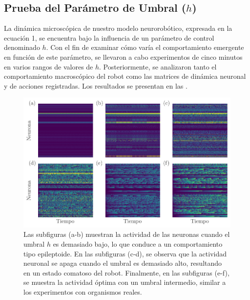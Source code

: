 \subsection{Prueba del Parámetro de Umbral ($h$)}	

La dinámica microscópica de nuestro modelo neurorobótico, expresada en la ecuación 1, se encuentra bajo la influencia de un parámetro de control denominado $h$. Con el fin de examinar cómo varía el comportamiento emergente en función de este parámetro, se llevaron a cabo experimentos de cinco minutos en varios rangos de valores de $h$. Posteriormente, se analizaron tanto el comportamiento macroscópico del robot como las matrices de dinámica neuronal y de acciones registradas. Los resultados se presentan en las  .


\begin{figure}[h!]
	\centering\includegraphics[width=\imsize]{valores-neuronas_umbrales.pdf}
	\caption[ Resultados de la Prueba del Parámetro de Umbral ($h$).]{ Las subfiguras (a-b) muestran la actividad de las neuronas cuando el umbral $h$ es demasiado bajo, lo que conduce a un comportamiento tipo epileptoide. En las subfiguras (c-d), se observa que la actividad neuronal se apaga cuando el umbral es demasiado alto, resultando en un estado comatoso del robot. Finalmente, en las subfiguras (e-f), se muestra la actividad óptima con un umbral intermedio, similar a los experimentos con organismos reales. }\label{fig:valores_neuronas_umbrales}
\end{figure}



